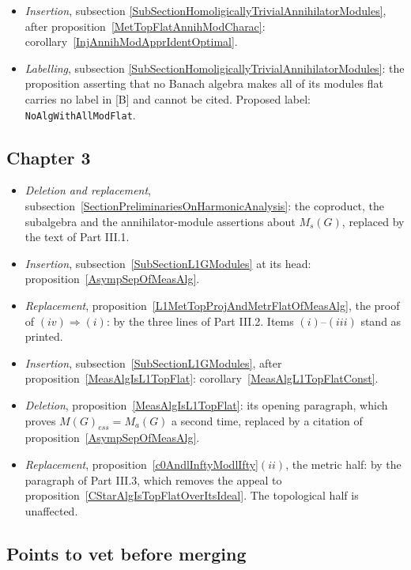 \documentclass[11pt]{article}
\theoremstyle{plain}
\theoremstyle{definition}
\begin{document}
\begin{itemize}
\item \emph{Insertion}, subsection
\ref{SubSectionHomoligicallyTrivialAnnihilatorModules}, after
proposition~\ref{MetTopFlatAnnihModCharac}:
corollary~\ref{InjAnnihModApprIdentOptimal}.

\item \emph{Labelling}, subsection
\ref{SubSectionHomoligicallyTrivialAnnihilatorModules}: the proposition
asserting that no Banach algebra makes all of its modules flat carries no label
in [B] and cannot be cited. Proposed label:
\texttt{NoAlgWithAllModFlat}.
\end{itemize}

\subsection{Chapter 3}

\begin{itemize}
\item \emph{Deletion and replacement},
subsection~\ref{SectionPreliminariesOnHarmonicAnalysis}: the coproduct, the
subalgebra and the annihilator-module assertions about $M_s(G)$, replaced by the
text of Part III.1.

\item \emph{Insertion}, subsection~\ref{SubSectionL1GModules} at its head:
proposition~\ref{AsympSepOfMeasAlg}.

\item \emph{Replacement}, proposition~\ref{L1MetTopProjAndMetrFlatOfMeasAlg},
the proof of $(iv)\Rightarrow(i)$: by the three lines of Part III.2. Items
$(i)$--$(iii)$ stand as printed.

\item \emph{Insertion}, subsection~\ref{SubSectionL1GModules}, after
proposition~\ref{MeasAlgIsL1TopFlat}:
corollary~\ref{MeasAlgL1TopFlatConst}.

\item \emph{Deletion}, proposition~\ref{MeasAlgIsL1TopFlat}: its opening
paragraph, which proves ${M(G)}_{ess}=M_a(G)$ a second time, replaced by a
citation of proposition~\ref{AsympSepOfMeasAlg}.

\item \emph{Replacement}, proposition~\ref{c0AndlInftyModlIfty}$(ii)$, the metric
half: by the paragraph of Part III.3, which removes the appeal to
proposition~\ref{CStarAlgIsTopFlatOverItsIdeal}. The topological half is
unaffected.
\end{itemize}

\subsection{Points to vet before merging}
\end{document}
